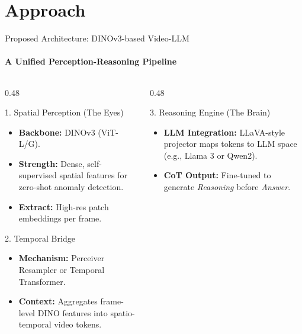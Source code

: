 \documentclass[aspectratio=169]{beamer}
\begin{document}
\section{Approach}
\begin{frame}{Proposed Architecture: DINOv3-based Video-LLM}
    \framesubtitle{A Unified Perception-Reasoning Pipeline}
    
    \begin{columns}[T]
        \begin{column}{0.48\textwidth}
            \begin{block}{1. Spatial Perception (The Eyes)}
                \begin{itemize}
                    \item \textbf{Backbone:} DINOv3 (ViT-L/G).
                    \item \textbf{Strength:} Dense, self-supervised spatial features for zero-shot anomaly detection.
                    \item \textbf{Extract:} High-res patch embeddings per frame.
                \end{itemize}
            \end{block}
            
            \begin{block}{2. Temporal Bridge}
                \begin{itemize}
                    \item \textbf{Mechanism:} Perceiver Resampler or Temporal Transformer.
                    \item \textbf{Context:} Aggregates frame-level DINO features into spatio-temporal video tokens.
                \end{itemize}
            \end{block}
        \end{column}
        
        \begin{column}{0.48\textwidth}
            \begin{block}{3. Reasoning Engine (The Brain)}
                \begin{itemize}
                    \item \textbf{LLM Integration:} LLaVA-style projector maps tokens to LLM space (e.g., Llama 3 or Qwen2).
                    \item \textbf{CoT Output:} Fine-tuned to generate \textit{Reasoning} before \textit{Answer}.
                \end{itemize}
            \end{block}
            

\end{column}
\end{columns}
\end{frame}
\end{document}
